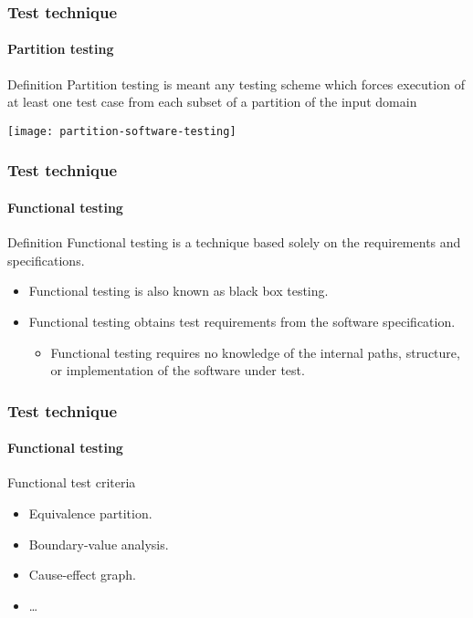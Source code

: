 \begin{frame}
\frametitle{Test technique}
\framesubtitle{Partition testing}
\label{concept:partition-testing}

\begin{block:concept}{Definition}
Partition testing is meant any testing scheme which forces execution
of at least one test case from each subset of a partition of the input
domain
\end{block:concept}

\begin{block:fact}{}
    \centering
    \texttt{[image: partition-software-testing]}
\end{block:fact}
\end{frame}



\begin{frame}
\frametitle{Test technique}
\framesubtitle{Functional testing}
\label{concept:functional-testing}

\begin{block:concept}{Definition}
Functional testing is a technique based solely on the requirements and
specifications.
\end{block:concept}

\begin{block:fact}{}
\begin{itemize}
	\item Functional testing is also known as black box testing.

	\item Functional testing obtains test requirements from the
	software specification.
	\begin{itemize}
		\item Functional testing requires no knowledge of the internal paths,
		structure, or implementation of the software under test.
	\end{itemize}
\end{itemize}
\end{block:fact}

\hfill
{}
\end{frame}


\begin{frame}
\frametitle{Test technique}
\framesubtitle{Functional testing}

\begin{block:fact}{Functional test criteria}
\begin{itemize}
	\item Equivalence partition.
	\item Boundary-value analysis.
	\item Cause-effect graph.
	\item \ldots
\end{itemize}
\end{block:fact}
\end{frame}



